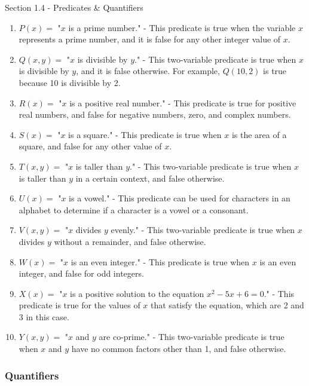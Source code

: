 \begin{notes}{Section 1.4 - Predicates \& Quantifiers}
\begin{Highlight}
        \begin{enumerate}
            \item \(P(x) =\) "\(x\) is a prime number." - This predicate is true when the variable \(x\) represents a prime number, and it is false for any other integer value of \(x\).
            \item \(Q(x, y) =\) "\(x\) is divisible by \(y\)." - This two-variable predicate is true when \(x\) is divisible by \(y\), and it is false otherwise. For example, \(Q(10, 2)\) is true because 10 is divisible by 2.
            \item \(R(x) =\) "\(x\) is a positive real number." - This predicate is true for positive real numbers, and false for negative numbers, zero, and complex numbers.
            \item \(S(x) =\) "\(x\) is a square." - This predicate is true when \(x\) is the area of a square, and false for any other value of \(x\).
            \item \(T(x, y) =\) "\(x\) is taller than \(y\)." - This two-variable predicate is true when \(x\) is taller than \(y\) in a certain context, and false otherwise.
            \item \(U(x) =\) "\(x\) is a vowel." - This predicate can be used for characters in an alphabet to determine if a character is a vowel or a consonant.
            \item \(V(x, y) =\) "\(x\) divides \(y\) evenly." - This two-variable predicate is true when \(x\) divides \(y\) without a remainder, and false otherwise.
            \item \(W(x) =\) "\(x\) is an even integer." - This predicate is true when \(x\) is an even integer, and false for odd integers.
            \item \(X(x) =\) "\(x\) is a positive solution to the equation \(x^2 - 5x + 6 = 0\)." - This predicate is true for the values of \(x\) that satisfy the equation, which are 2 and 3 in this case.
            \item \(Y(x, y) =\) "\(x\) and \(y\) are co-prime." - This two-variable predicate is true when \(x\) and \(y\) have no common factors other than 1, and false otherwise.
        \end{enumerate}
    \end{Highlight}

    \subsubsection*{Quantifiers}


\end{notes}

